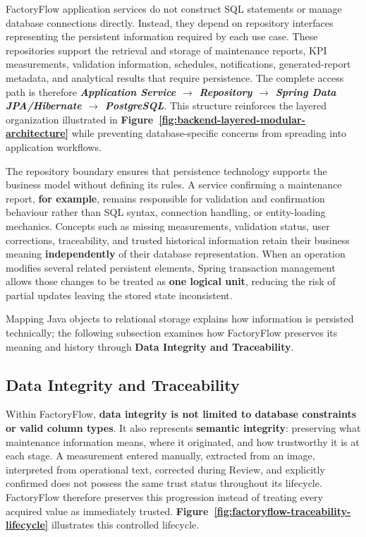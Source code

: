 FactoryFlow application services do not construct SQL statements or manage database connections directly. Instead, they depend on repository interfaces representing the persistent information required by each use case. These repositories support the retrieval and storage of maintenance reports, KPI measurements, validation information, schedules, notifications, generated-report metadata, and analytical results that require persistence. The complete access path is therefore \textbf{\textit{Application Service $\rightarrow$ Repository $\rightarrow$ Spring Data JPA/Hibernate $\rightarrow$ PostgreSQL}}. This structure reinforces the layered organization illustrated in \textbf{Figure~\ref{fig:backend-layered-modular-architecture}} while preventing database-specific concerns from spreading into application workflows.

The repository boundary ensures that persistence technology supports the business model without defining its rules. A service confirming a maintenance report, \textbf{for example}, remains responsible for validation and confirmation behaviour rather than SQL syntax, connection handling, or entity-loading mechanics. Concepts such as missing measurements, validation status, user corrections, traceability, and trusted historical information retain their business meaning \textbf{independently} of their database representation. When an operation modifies several related persistent elements, Spring transaction management allows those changes to be treated as \textbf{one logical unit}, reducing the risk of partial updates leaving the stored state inconsistent.

Mapping Java objects to relational storage explains how information is persisted technically; the following subsection examines how FactoryFlow preserves its meaning and history through \textbf{Data Integrity and Traceability}.

\subsection{Data Integrity and Traceability}
\label{subsec:data-integrity-traceability}

Within FactoryFlow, \textbf{data integrity is not limited to database constraints or valid column types}. It also represents \textbf{semantic integrity}: preserving what maintenance information means, where it originated, and how trustworthy it is at each stage. A measurement entered manually, extracted from an image, interpreted from operational text, corrected during Review, and explicitly confirmed does not possess the same trust status throughout its lifecycle. FactoryFlow therefore preserves this progression instead of treating every acquired value as immediately trusted. \textbf{Figure~\ref{fig:factoryflow-traceability-lifecycle}} illustrates this controlled lifecycle.


